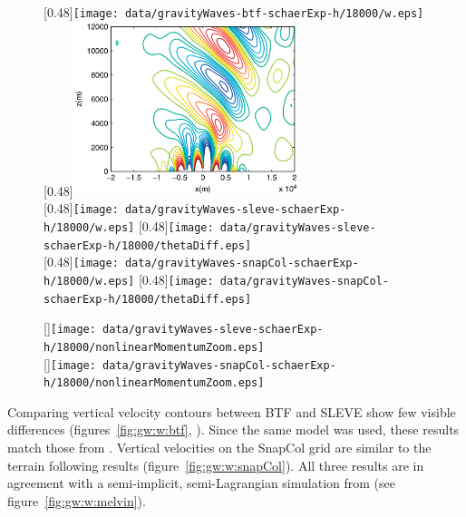 \begin{figure}
	\captionsetup[subfigure]{position=b}
	\centering
	[0.48\textwidth]{\texttt{[image: data/gravityWaves-btf-schaerExp-h/18000/w.eps]}}
	\hfill
	[0.48\textwidth]{\includegraphics[height=2in]{img/melvin-7a.png}} \\
	[0.48\textwidth]{\texttt{[image: data/gravityWaves-sleve-schaerExp-h/18000/w.eps]}}
	\hfill
	[0.48\textwidth]{\texttt{[image: data/gravityWaves-sleve-schaerExp-h/18000/thetaDiff.eps]}} \\
	[0.48\textwidth]{\texttt{[image: data/gravityWaves-snapCol-schaerExp-h/18000/w.eps]}}
	\hfill
	[0.48\textwidth]{\texttt{[image: data/gravityWaves-snapCol-schaerExp-h/18000/thetaDiff.eps]} }
	\caption{}
	\label{fig:gw:w}
\end{figure}

\begin{figure}
	\captionsetup[subfigure]{position=b}
	\centering
	[\textwidth]{\texttt{[image: data/gravityWaves-sleve-schaerExp-h/18000/nonlinearMomentumZoom.eps]}} \\
	[\textwidth]{\texttt{[image: data/gravityWaves-snapCol-schaerExp-h/18000/nonlinearMomentumZoom.eps]}}
	\caption{}
	\label{fig:gw:thetaDiffZoom}
\end{figure}

Comparing vertical velocity contours between BTF and SLEVE show few visible differences (figures~\ref{fig:gw:w:btf}, ).  Since the same model was used, these results match those from \textcite{weller-shahrokhi2014}.  Vertical velocities on the SnapCol grid are similar to the terrain following results (figure~\ref{fig:gw:w:snapCol}).  All three results are in agreement with a semi-implicit, semi-Lagrangian simulation from \textcite{melvin2010} (see figure~\ref{fig:gw:w:melvin}).

